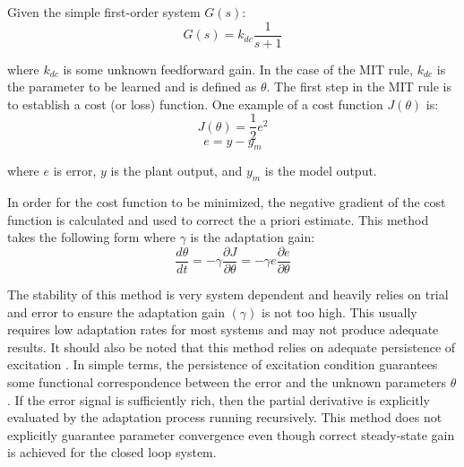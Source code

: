 Given the simple first-order system $G(s)$:
\begin{equation}
G(s) = k_{dc}\frac{1}{s+1}
\end{equation}

where $k_{dc}$ is some unknown feedforward gain.  In the case of the MIT rule, $k_{dc}$ is the parameter to be learned and is defined as $\theta$.  The first step in the MIT rule is to establish a cost (or loss) function.  One example of a cost function $J(\theta)$ is:
\begin{equation}
J(\theta) = \frac{1}{2}e^2
\end{equation}
\begin{equation}
e=y-y_m
\end{equation}

where $e$ is error, $y$ is the plant output, and $y_m$ is the model output.

In order for the cost function to be minimized, the negative gradient of the cost function is calculated and used to correct the a priori estimate.  This method takes the following form where $\gamma$ is the adaptation gain:
\begin{equation}
\frac{d\theta}{dt}=-\gamma \frac{\partial{J}}{\partial{\theta}} =-\gamma e\frac{\partial{e}}{\partial{\theta}}
\end{equation}

The stability of this method is very system dependent and heavily relies on trial and error to ensure the adaptation gain $(\gamma)$ is not too high.  This usually requires low adaptation rates for most systems and may not produce adequate results.  It should also be noted that this method relies on adequate persistence of excitation \cite{aastrom2013adaptive}.  In simple terms, the persistence of excitation condition guarantees some functional correspondence between the error and the unknown parameters $\theta$. If the error signal is sufficiently rich, then the partial derivative is explicitly evaluated by the adaptation process running recursively.  This method does not explicitly guarantee parameter convergence even though correct steady-state gain is achieved for the closed loop system.




